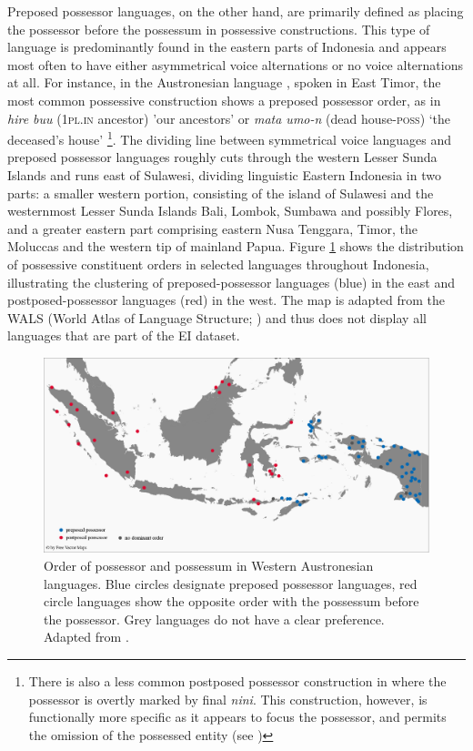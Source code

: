 Preposed possessor languages, on the other hand, are primarily defined as placing the possessor before the possessum in possessive constructions. This type of language is predominantly found in the eastern parts of Indonesia and appears most often to have either asymmetrical voice alternations or no voice alternations at all. For instance, in the Austronesian language , spoken in East Timor, the most common possessive construction shows a preposed possessor order, as in \textit{hire buu} (1\textsc{pl}.\textsc{in} ancestor) 'our ancestors' or \textit{mata umo-n} (dead house-\textsc{poss}) `the deceased's house' \citep[31]{bowden2006} \footnote{There is also a less common postposed possessor construction in  where the possessor is overtly marked by final \textit{nini}. This construction, however, is functionally more specific as it appears to focus the possessor, and permits the omission of the possessed entity (see \citealt[32]{bowden2006})}. The dividing line between symmetrical voice languages and preposed possessor languages roughly cuts through the western Lesser Sunda Islands and runs east of Sulawesi, dividing linguistic Eastern Indonesia in two parts: a smaller western portion, consisting of the island of Sulawesi and the westernmost Lesser Sunda Islands Bali, Lombok, Sumbawa and possibly Flores, and a greater eastern part comprising eastern Nusa Tenggara, Timor, the Moluccas and the western tip of mainland Papua. Figure \ref{figure:preposed} shows the distribution of possessive constituent orders in selected languages throughout Indonesia, illustrating the clustering of preposed-possessor languages (blue) in the east and postposed-possessor languages (red) in the west. The map is adapted from the WALS (World Atlas of Language Structure; \citealt{wals-86}) and thus does not display all languages that are part of the EI dataset.

\begin{figure}
\includegraphics[width=\columnwidth]{figures/Preposed_possessor.eps}
\caption[Order of possessor and possessum in Western Austronesian languages]{Order of possessor and possessum in Western Austronesian languages. Blue circles designate preposed possessor languages, red circle languages show the opposite order with the possessum before the possessor. Grey languages do not have a clear preference. Adapted from \citealt{wals-86}.}\label{figure:preposed}
\end{figure}


